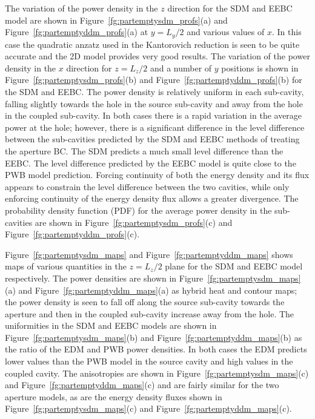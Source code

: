 \documentclass[a4paper]{article}
\numberwithin{equation}{section}
\newcounter{Figure}
\begin{document}
The variation of the power density in the $z$ direction for the SDM and EEBC model are shown in 
Figure~\ref{fg:partemptysdm_profs}(a) and Figure~\ref{fg:partemptyddm_profs}(a) at $y=L_y/2$ and various 
values of $x$. In this case the quadratic anzatz used in the Kantorovich reduction
is seen to be quite accurate and the 2D model provides very good results. The variation of the power density 
in the $x$ direction for $z=L_z/2$ and a number of $y$ positions is shown in Figure~\ref{fg:partemptysdm_profs}(b)
and Figure~\ref{fg:partemptyddm_profs}(b) for the SDM and EEBC. The power density is relatively uniform in each
sub-cavity, falling slightly towards the hole in the source sub-cavity and away from the hole in the coupled 
sub-cavity. In both cases there is a rapid variation in the average power at the hole; however, there is a 
significant difference in the level difference between the sub-cavities predicted by the SDM and EEBC methods 
of treating the aperture BC. The SDM predicts a much small level difference than the EEBC. The level difference
predicted by the EEBC model is quite close to the PWB model prediction. Forcing continuity of both the energy
density and its flux appears to constrain the level difference between the two cavities, while only enforcing
continuity of the energy density flux allows a greater divergence. The probability density function (PDF)
for the average power density in the sub-cavities are shown in Figure~\ref{fg:partemptysdm_profs}(c) and
Figure~\ref{fg:partemptyddm_profs}(c).

Figure~\ref{fg:partemptysdm_maps} and Figure~\ref{fg:partemptyddm_maps} shows maps of various quantities in 
the $z=L_z/2$ plane for the SDM and EEBC model respectively. The power densities are shown in 
Figure~\ref{fg:partemptysdm_maps}(a) and Figure~\ref{fg:partemptyddm_maps}(a) as hybrid heat and contour maps; 
the power density is seen to fall off along the source sub-cavity towards the aperture and then in the coupled
sub-cavity increase away from the hole. The uniformities in the SDM and EEBC models are shown in 
Figure~\ref{fg:partemptysdm_maps}(b) and Figure~\ref{fg:partemptyddm_maps}(b) as the ratio of the EDM and 
PWB power densities. In both cases the EDM predicts lower values than the PWB model in the source cavity and
high values in the coupled cavity. The anisotropies are shown in Figure~\ref{fg:partemptysdm_maps}(c) and
Figure~\ref{fg:partemptyddm_maps}(c) and are fairly similar for the two aperture models, as are the energy
density fluxes shown in Figure~\ref{fg:partemptysdm_maps}(c) and Figure~\ref{fg:partemptyddm_maps}(c).
\end{document}
